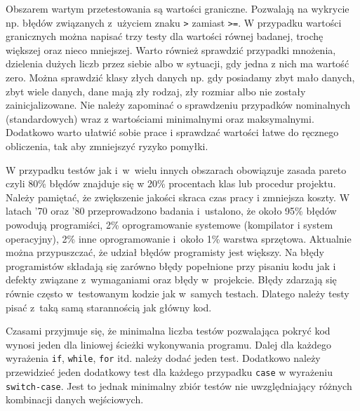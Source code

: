 Obszarem wartym przetestowania są wartości graniczne. Pozwalają na wykrycie np. błędów związanych z~użyciem znaku \texttt{>} zamiast \texttt{>=}. W przypadku wartości granicznych można napisać trzy testy dla wartości równej badanej, trochę większej oraz nieco mniejszej. Warto również sprawdzić przypadki mnożenia, dzielenia dużych liczb przez siebie albo w sytuacji, gdy jedna z nich ma wartość zero. Można sprawdzić klasy złych danych np. gdy posiadamy zbyt mało danych, zbyt wiele danych, dane mają zły rodzaj, zły rozmiar albo nie zostały zainicjalizowane. Nie należy zapominać o sprawdzeniu przypadków nominalnych (standardowych) wraz z wartościami minimalnymi oraz maksymalnymi. Dodatkowo warto ułatwić sobie prace i sprawdzać wartości łatwe do ręcznego obliczenia, tak aby zmniejszyć ryzyko pomyłki. 

W przypadku testów jak i~w~wielu innych obszarach obowiązuje zasada pareto czyli 80\% błędów znajduje się w 20\% procentach klas lub procedur projektu. Należy pamiętać, że zwiększenie jakości skraca czas pracy i zmniejsza koszty. W latach '70 oraz '80 przeprowadzono badania\cite{kod_doskonaly_steve_mcconnell} i~ustalono, że około 95\% błędów powodują programiści, 2\% oprogramowanie systemowe (kompilator i system operacyjny), 2\% inne oprogramowanie i~około 1\% warstwa sprzętowa. Aktualnie można przypuszczać, że udział błędów programisty jest większy. Na błędy programistów składają się zarówno błędy popełnione przy pisaniu kodu jak i defekty związane z~wymaganiami oraz błędy w~projekcie. Błędy zdarzają się równie często w~testowanym kodzie jak w~samych testach. Dlatego należy testy pisać z~taką samą starannością jak główny kod. 

Czasami przyjmuje się, że minimalna liczba testów pozwalająca pokryć kod wynosi jeden dla liniowej ścieżki wykonywania programu. Dalej dla każdego wyrażenia \texttt{if}, \texttt{while}, \texttt{for} itd. należy dodać jeden test. Dodatkowo należy przewidzieć jeden dodatkowy test dla każdego przypadku \texttt{case} w wyrażeniu \texttt{switch-case}. Jest to jednak minimalny zbiór testów nie uwzględniający różnych kombinacji danych wejściowych. 

  
